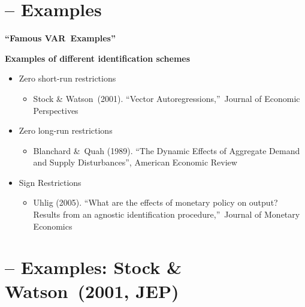 \documentclass[10pt,handout]{beamer}
\begin{document}
\section{ -- Examples}

\begin{frame}
\color{title} \centering \Large%
\textbf{\textquotedblleft Famous VAR\ Examples\textquotedblright }
\end{frame}

\vspace{.1cm}

\begin{frame}
{\textbf{Examples of different identification schemes}}

\begin{itemize}
\item Zero short-run restrictions

\begin{itemize}
\item Stock \& Watson\ (2001). \textquotedblleft Vector
Autoregressions,\textquotedblright\ Journal of Economic Perspectives\medskip 
\pause
\end{itemize}

\item Zero long-run restrictions

\begin{itemize}
\item Blanchard \&\ Quah (1989). \textquotedblleft The Dynamic Effects of
Aggregate Demand and Supply Disturbances\textquotedblright , American
Economic Review\medskip \pause
\end{itemize}

\item Sign Restrictions

\begin{itemize}
\item Uhlig (2005). \textquotedblleft What are the effects of monetary
policy on output? Results from an agnostic identification
procedure,\textquotedblright\ Journal of Monetary Economics
\end{itemize}
\end{itemize}
\end{frame}

\vspace{.1cm}

\section{ -- Examples: Stock \& Watson\ (2001, JEP)}
\end{document}
